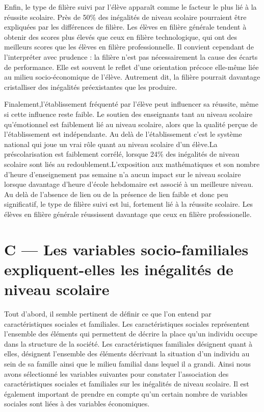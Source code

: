 \documentclass[
  french,
  11pt,
  a4paper,
]{report}
\begin{document}
Enfin, le type de filière suivi par l'élève apparaît comme le facteur le
plus lié à la réussite scolaire. Près de 50\% des inégalités de niveau
scolaire pourraient être expliquées par les différences de filière. Les
élèves en filière générale tendent à obtenir des scores plus élevés que
ceux en filière technologique, qui ont des meilleurs scores que les
élèves en filière professionnelle. Il convient cependant de
l'interpréter avec prudence : la filière n'est pas nécessairement la
cause des écarts de performance. Elle est souvent le reflet d'une
orientation précoce elle-même liée au milieu socio-économique de
l'élève. Autrement dit, la filière pourrait davantage cristalliser des
inégalités préexistantes que les produire.

Finalement,l'établissement fréquenté par l'élève peut influencer sa
réussite, même si cette influence reste faible. Le soutien des
enseignants tant au niveau scolaire qu'émotionnel est faiblement lié au
niveau scolaire, alors que la qualité perçue de l'établissement est
indépendante. Au delà de l'établissement c'est le système national qui
joue un vrai rôle quant au niveau scolaire d'un élève.La
préscolarisation est faiblement corrélé, lorsque 24\% des inégalités de
niveau scolaire sont liés au redoublement.L'exposition aux mathématiques
et son nombre d'heure d'enseignement pas semaine n'a aucun impact sur le
niveau scolaire lorsque davantage d'heure d'école hebdomaire est associé
à un meilleure niveau. Au delà de l'absence de lien ou de la présence de
lien faible et donc peu significatif, le type de filière suivi est lui,
fortement lié à la réussite scolaire. Les élèves en filière générale
réussissent davantage que ceux en filière professionelle.

\section{C --- Les variables socio-familiales expliquent-elles les
inégalités de niveau
scolaire}\label{c-les-variables-socio-familiales-expliquent-elles-les-inuxe9galituxe9s-de-niveau-scolaire}

Tout d'abord, il semble pertinent de définir ce que l'on entend par
caractéristiques sociales et familiales. Les caractéristiques sociales
représentent l'ensemble des éléments qui permettent de décrire la place
qu'un individu occupe dans la structure de la société. Les
caractéristiques familiales désignent quant à elles, désignent
l'ensemble des éléments décrivant la situation d'un individu au sein de
sa famille ainsi que le milieu familial dans lequel il a grandi. Ainsi
nous avons sélectionné les variables suivantes pour constater
l'association des caractéristiques sociales et familiales sur les
inégalités de niveau scolaire. Il est également important de prendre en
compte qu'un certain nombre de variables sociales sont liées à des
variables économiques.
\end{document}
